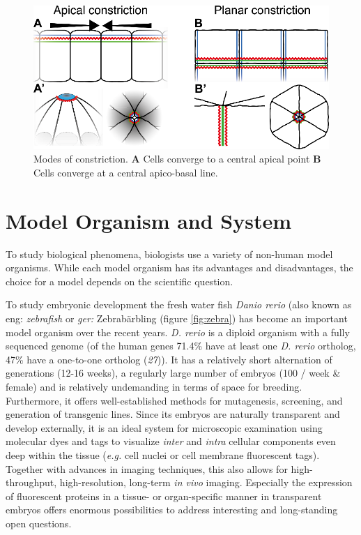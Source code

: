 \documentclass[10pt, b5paper, singlespacinge, twoside]{reedthesis} %
\theoremstyle{definition}
\theoremstyle{definition}
\theoremstyle{definition}
\theoremstyle{remark}
\begin{document}
\begin{figure}

{\centering \includegraphics[width=0.7\linewidth]{figures/intro/constriction} 

}

\caption[Modes of constriction]{Modes of constriction. \textbf{A} Cells converge to a central apical point \textbf{B} Cells converge at a central apico-basal line.}\label{fig:constr}
\end{figure}
\hypertarget{model-organism-and-system}{%
\section{Model Organism and System}\label{model-organism-and-system}}

To study biological phenomena, biologists use a variety of non-human model organisms. While each model organism has its advantages and disadvantages, the choice for a model depends on the scientific question.

To study embryonic development the fresh water fish \emph{Danio rerio} (also known as eng: \emph{zebrafish} or \emph{ger:} Zebrabärbling (figure \ref{fig:zebra}) has become an important model organism over the recent years. \emph{D. rerio} is a diploid organism with a fully sequenced genome (of the human genes 71.4\% have at least one \emph{D. rerio} ortholog, 47\% have a one-to-one ortholog (\emph{27})). It has a relatively short alternation of generations (12-16 weeks), a regularly large number of embryos (100 / week \& female) and is relatively undemanding in terms of space for breeding. Furthermore, it offers well-established methods for mutagenesis, screening, and generation of transgenic lines. Since its embryos are naturally transparent and develop externally, it is an ideal system for microscopic examination using molecular dyes and tags to visualize \emph{inter} and \emph{intra} cellular components even deep within the tissue (\emph{e.g.} cell nuclei or cell membrane fluorescent tags). Together with advances in imaging techniques, this also allows for high-throughput, high-resolution, long-term \emph{in vivo} imaging. Especially the expression of fluorescent proteins in a tissue- or organ-specific manner in transparent embryos offers enormous possibilities to address interesting and long-standing open questions.
\end{document}
